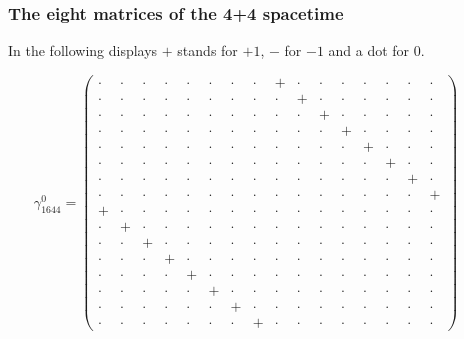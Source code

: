 \documentclass[
  10pt,
]{article}
\begin{document}
\hypertarget{the-eight-matrices-of-the-44-spacetime}{%
\subsubsection{The eight matrices of the 4+4
spacetime}\label{the-eight-matrices-of-the-44-spacetime}}

In the following displays \(+\) stands for \(+1\), \(-\) for \(-1\) and
a dot for \(0\).

\[\gamma_{1644}^0=\left(\begin{smallmatrix} \cdot & \cdot & \cdot & \cdot & \cdot & \cdot & \cdot & \cdot & + & \cdot & \cdot & \cdot & \cdot & \cdot & \cdot & \cdot \\ \cdot & \cdot & \cdot & \cdot & \cdot & \cdot & \cdot & \cdot & \cdot & + & \cdot & \cdot & \cdot & \cdot & \cdot & \cdot \\ \cdot & \cdot & \cdot & \cdot & \cdot & \cdot & \cdot & \cdot & \cdot & \cdot & + & \cdot & \cdot & \cdot & \cdot & \cdot \\ \cdot & \cdot & \cdot & \cdot & \cdot & \cdot & \cdot & \cdot & \cdot & \cdot & \cdot & + & \cdot & \cdot & \cdot & \cdot \\ \cdot & \cdot & \cdot & \cdot & \cdot & \cdot & \cdot & \cdot & \cdot & \cdot & \cdot & \cdot & + & \cdot & \cdot & \cdot \\ \cdot & \cdot & \cdot & \cdot & \cdot & \cdot & \cdot & \cdot & \cdot & \cdot & \cdot & \cdot & \cdot & + & \cdot & \cdot \\ \cdot & \cdot & \cdot & \cdot & \cdot & \cdot & \cdot & \cdot & \cdot & \cdot & \cdot & \cdot & \cdot & \cdot & + & \cdot \\ \cdot & \cdot & \cdot & \cdot & \cdot & \cdot & \cdot & \cdot & \cdot & \cdot & \cdot & \cdot & \cdot & \cdot & \cdot & + \\ + & \cdot & \cdot & \cdot & \cdot & \cdot & \cdot & \cdot & \cdot & \cdot & \cdot & \cdot & \cdot & \cdot & \cdot & \cdot \\ \cdot & + & \cdot & \cdot & \cdot & \cdot & \cdot & \cdot & \cdot & \cdot & \cdot & \cdot & \cdot & \cdot & \cdot & \cdot \\ \cdot & \cdot & + & \cdot & \cdot & \cdot & \cdot & \cdot & \cdot & \cdot & \cdot & \cdot & \cdot & \cdot & \cdot & \cdot \\ \cdot & \cdot & \cdot & + & \cdot & \cdot & \cdot & \cdot & \cdot & \cdot & \cdot & \cdot & \cdot & \cdot & \cdot & \cdot \\ \cdot & \cdot & \cdot & \cdot & + & \cdot & \cdot & \cdot & \cdot & \cdot & \cdot & \cdot & \cdot & \cdot & \cdot & \cdot \\ \cdot & \cdot & \cdot & \cdot & \cdot & + & \cdot & \cdot & \cdot & \cdot & \cdot & \cdot & \cdot & \cdot & \cdot & \cdot \\ \cdot & \cdot & \cdot & \cdot & \cdot & \cdot & + & \cdot & \cdot & \cdot & \cdot & \cdot & \cdot & \cdot & \cdot & \cdot \\ \cdot & \cdot & \cdot & \cdot & \cdot & \cdot & \cdot & + & \cdot & \cdot & \cdot & \cdot & \cdot & \cdot & \cdot & \cdot \end{smallmatrix}\right)\qquad
\]
\end{document}
